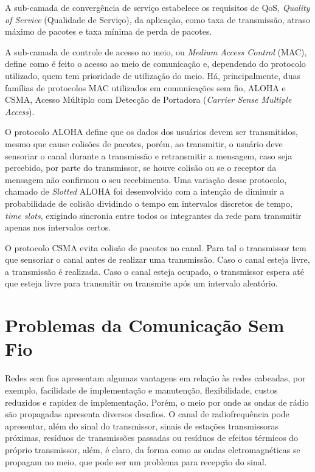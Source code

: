 A sub-camada de convergência de serviço estabelece os requisitos de QoS, \emph{Quality of Service} (Qualidade de Serviço), da aplicação, como taxa de transmissão, atraso máximo de pacotes e taxa mínima de perda de pacotes.

A sub-camada de controle de acesso ao meio, ou \emph{Medium Access Control} (MAC), define como é feito o acesso ao meio de comunicação e, dependendo do protocolo utilizado, quem tem prioridade de utilização do meio. Há, principalmente, duas famílias de protocolos MAC utilizados em comunicações sem fio, ALOHA e CSMA, Acesso Múltiplo com Detecção de Portadora (\emph{Carrier Sense Multiple Access}).

O protocolo ALOHA define que os dados dos usuários devem ser transmitidos, mesmo que cause colisões de pacotes, porém, ao transmitir, o usuário deve sensoriar o canal durante a transmissão e retransmitir a mensagem, caso seja percebido, por parte do transmissor, se houve colisão ou se o receptor da mensagem não confirmou o seu recebimento. Uma variação desse protocolo, chamado de \emph{Slotted} ALOHA foi desenvolvido com a intenção de diminuir a probabilidade de colisão dividindo o tempo em intervalos discretos de tempo, \emph{time slots}, exigindo sincronia entre todos os integrantes da rede para transmitir apenas nos intervalos certos.

O protocolo CSMA evita colisão de pacotes no canal. Para tal o transmissor tem que sensoriar o canal antes de realizar uma transmissão. Caso o canal esteja livre, a transmissão é realizada. Caso o canal esteja ocupado, o transmissor espera até que esteja livre para transmitir ou transmite após um intervalo aleatório.


\section{Problemas da Comunicação Sem Fio}
Redes sem fios apresentam algumas vantagens em relação às redes cabeadas, por exemplo, facilidade de implementação e manutenção, flexibilidade, custos reduzidos e rapidez de implementação. Porém, o meio por onde as ondas de rádio são propagadas apresenta diversos desafios. O canal de radiofrequência pode apresentar, além do sinal do transmissor, sinais de estações transmissoras próximas, resíduos de transmissões passadas ou resíduos de efeitos térmicos do próprio transmissor, além, é claro, da forma como as ondas eletromagnéticas se propagam no meio, que pode ser um problema para recepção do sinal.

